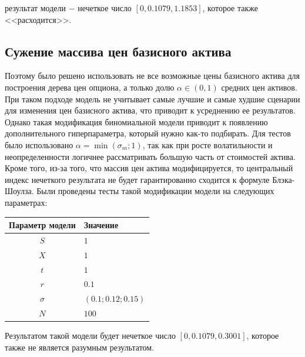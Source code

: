 \documentclass[a4paper, 12pt]{extarticle}
\begin{document}
	 результат модели $-$ нечеткое число $[0, 0.1079, 1.1853]$, которое также <<расходится>>. 
	 
	\subsection{Сужение массива цен базисного актива}
	Поэтому было решено использовать не все возможные цены базисного актива для построения дерева цен опциона, а только долю $\alpha \in (0,1)$ средних цен активов. При таком подходе модель не учитывает самые лучшие и самые худшие сценарии для изменения цен базисного актива, что приводит к усреднению ее результатов. Однако такая модификация биномиальной модели приводит к появлению дополнительного гиперпараметра, который нужно как-то подбирать. Для тестов было использовано $\alpha=\min(\sigma_m; 1)$, так как при росте волатильности и неопределенности логичнее рассматривать большую часть от стоимостей актива. Кроме того, из-за того, что массив цен актива модифицируется, то центральный индекс нечеткого результата не будет гарантированно сходится к формуле Блэка-Шоулза. Были проведены тесты такой модификации модели на следующих параметрах: 
	\begin{center}
		\begin{tabular}{|c|l|}
			\hline
			\textbf{Параметр модели} & \textbf{Значение} \\
			\hline
			$S$ & $1$ \\
			$X$ & $1$ \\
			$t$ & $1$ \\
			$r$ & $0.1$ \\
			$\sigma$ & $(0.1; 0.12; 0.15)$ \\
			$N$ & $100$ \\
			\hline
		\end{tabular}
	\end{center}
	
	Результатом такой модели будет нечеткое число $[0, 0.1079, 0.3001]$, которое также не является разумным результатом. 
	
\end{document}
